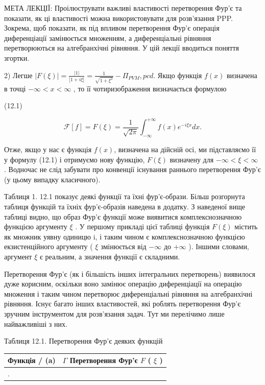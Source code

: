 \documentclass[
  ukrainian,
]{article}
\newcounter{none} %
\begin{document}
МЕТА ЛЕКЦІЇ: Проілюструвати важливі властивості перетворення Фур'є та
показати, як ці властивості можна використовувати для розв'язання PPP.
Зокрема, щоб показати, як під впливом перетворення Фур'є операція
диференціації замінюється множенням, а диференціальні рівняння
перетворюються на алгебранхічні рівняння. У цій лекції вводиться поняття
згортки.

2) Легше
\(|F(\xi)| = \frac{|1|}{|1+i\xi|} = \frac{1}{\sqrt{1+\xi^2}} - \Pi_{PVM}, pcd.\)
Якщо функція \(f(x)\) визначена в точці \(-\infty < x < \infty\) , то її
чотиризображення визначається формулою

(12.1)

\[
\mathcal{F}[f] = F(\xi) = \frac{1}{\sqrt{2\pi}} \int_{-\infty}^{+\infty} f(x) e^{-i\xi x} dx.
\]

Отже, якщо у нас є функція \(f(x)\), визначена на дійсній осі, ми
підставляємо її у формулу (12.1) і отримуємо нову функцію, \(F(\xi)\)
визначену для \(-\infty < \xi < \infty\) . Водночас не слід забувати про
конвенції існування раннього перетворення Фур'є (у цьому випадку
класичного).

Таблиця 1. 12.1 показує деякі функції та їхні фур'є-образи. Більш
розгорнута таблиця функцій та їхніх фур'є-образів наведена в додатку. З
наведеної вище таблиці видно, що образ Фур'є функції може виявитися
комплекснозначною функцією аргументу \(\xi\) . У першому прикладі цієї
таблиці функція \(F(\xi)\) містить як множник уявну одиницю i, і таким
чином є комплекснозначною функцією екзистенційного аргументу ( \(\xi\)
змінюється від \(-\infty\) до \(+\infty\) ). Іншими словами, аргумент
\(\xi\) є реальним, а значення функції є складними.

Перетворення Фур'є (як і більшість інших інтегральних перетворень)
виявилося дуже корисним, оскільки воно замінює операцію диференціації на
операцію множення і таким чином перетворює диференціальні рівняння на
алгебранхічні рівняння. Існує багато інших властивостей, які роблять
перетворення Фур'є зручним інструментом для розв'язання задач. Тут ми
перелічимо лише найважливіші з них.

Таблиця 12.1. Перетворення Фур'є деяких функцій

{\def\LTcaptype{none} %
\begin{longtable}[]{@{}
  >{\raggedright\arraybackslash}p{}
  >{\raggedright\arraybackslash}p{}@{}}
\toprule\noalign{}
\begin{minipage}[b]{\linewidth}\raggedright
Функція / (a)
\end{minipage} & \begin{minipage}[b]{\linewidth}\raggedright
\(\Gamma\) Перетворення Фур'є \(F\) ( \(\xi\) )
\end{minipage} \\
\midrule\noalign{}
\endhead
\bottomrule\noalign{}
\endlastfoot
1. & \\
\end{longtable}
}
\end{document}
